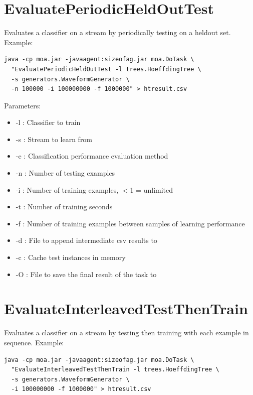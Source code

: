 \documentclass[a4paper,12pt,twoside]{book}
\begin{document}
\section{EvaluatePeriodicHeldOutTest}

Evaluates a classifier on a stream by periodically testing on a heldout set.
Example:
\begin{footnotesize}\begin{verbatim}
java -cp moa.jar -javaagent:sizeofag.jar moa.DoTask \
  "EvaluatePeriodicHeldOutTest -l trees.HoeffdingTree \
  -s generators.WaveformGenerator \
  -n 100000 -i 100000000 -f 1000000" > htresult.csv
\end{verbatim}\end{footnotesize}

Parameters:
\begin{itemize}
\item -l : Classifier to train
\item -s : Stream to learn from
\item -e : Classification performance evaluation method
\item -n : Number of testing examples
\item -i : Number of training examples, $<$1 = unlimited
\item -t : Number of training seconds
\item -f : Number of training examples between samples of learning performance
\item -d : File to append intermediate csv results to
\item -c : Cache test instances in memory
\item -O : File to save the final result of the task to
\end{itemize}

\section{EvaluateInterleavedTestThenTrain}
Evaluates a classifier on a stream by testing then training with each example in sequence.
Example:
\begin{footnotesize}\begin{verbatim}
java -cp moa.jar -javaagent:sizeofag.jar moa.DoTask \
  "EvaluateInterleavedTestThenTrain -l trees.HoeffdingTree \
  -s generators.WaveformGenerator \
  -i 100000000 -f 1000000" > htresult.csv
\end{verbatim}
\end{footnotesize}
\end{document}
